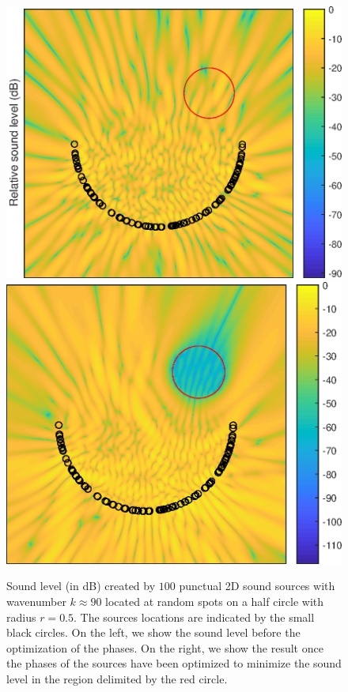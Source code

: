 \documentclass[smallextended]{svjour3}
\begin{document}
\begin{figure}
	\centering	
	\includegraphics[scale = 0.45]{epsFig1_new.eps}		
	\includegraphics[scale = 0.45]{epsFig2_new.eps}
	\caption{Sound level (in dB) created by $100$ punctual 2D sound sources with wavenumber $k\approx 90$ located at random spots on a half circle with radius $r = 0.5$. The sources locations are indicated by the small black circles. On the left, we show the sound level before the optimization of the phases. On the right, we show the result once the phases of the sources have been optimized to minimize the sound level in the region delimited by the red circle. }
	\label{figMinimizationHelmholtz}
\end{figure}




\end{document}
